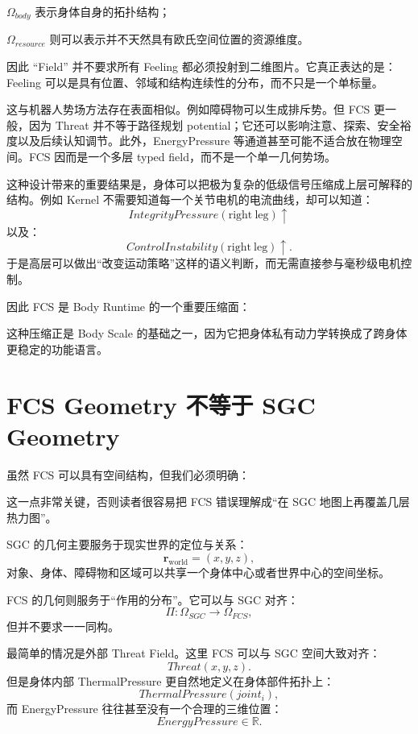 $\Omega_{body}$ 表示身体自身的拓扑结构；

$\Omega_{resource}$ 则可以表示并不天然具有欧氏空间位置的资源维度。

因此 ``Field'' 并不要求所有 Feeling 都必须投射到二维图片。它真正表达的是：Feeling 可以是具有位置、邻域和结构连续性的分布，而不只是一个单标量。

这与机器人势场方法存在表面相似。例如障碍物可以生成排斥势。但 FCS 更一般，因为 Threat 并不等于路径规划 potential；它还可以影响注意、探索、安全裕度以及后续认知调节。此外，EnergyPressure 等通道甚至可能不适合放在物理空间。FCS 因而是一个多层 typed field，而不是一个单一几何势场。

这种设计带来的重要结果是，身体可以把极为复杂的低级信号压缩成上层可解释的结构。例如 Kernel 不需要知道每一个关节电机的电流曲线，却可以知道：
\[
IntegrityPressure(\mathrm{right\ leg})\uparrow
\]
以及：
\[
ControlInstability(\mathrm{right\ leg})\uparrow.
\]
于是高层可以做出“改变运动策略”这样的语义判断，而无需直接参与毫秒级电机控制。

因此 FCS 是 Body Runtime 的一个重要压缩面：
\begin{statementbox}
\centering
{}
\end{statementbox}
这种压缩正是 Body Scale 的基础之一，因为它把身体私有动力学转换成了跨身体更稳定的功能语言。

\section{FCS Geometry 不等于 SGC Geometry}

虽然 FCS 可以具有空间结构，但我们必须明确：
\begin{statementbox}
\centering
{}
\end{statementbox}
这一点非常关键，否则读者很容易把 FCS 错误理解成“在 SGC 地图上再覆盖几层热力图”。

SGC 的几何主要服务于现实世界的定位与关系：
\[
\mathbf r_{\mathrm{world}}
=
(x,y,z),
\]
对象、身体、障碍物和区域可以共享一个身体中心或者世界中心的空间坐标。

FCS 的几何则服务于“作用的分布”。它可以与 SGC 对齐：
\[
\Pi:
\Omega_{SGC}
\rightarrow
\Omega_{FCS},
\]
但并不要求一一同构。

最简单的情况是外部 Threat Field。这里 FCS 可以与 SGC 空间大致对齐：
\[
Threat(x,y,z).
\]
但是身体内部 ThermalPressure 更自然地定义在身体部件拓扑上：
\[
ThermalPressure(joint_i),
\]
而 EnergyPressure 往往甚至没有一个合理的三维位置：
\[
EnergyPressure\in\mathbb R.
\]

